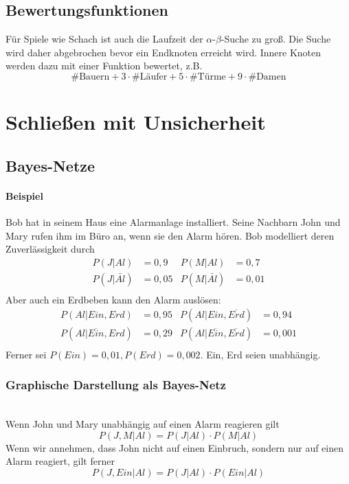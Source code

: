 \documentclass[a4paper]{scrartcl}
\begin{document}
\subsection{Bewertungsfunktionen} Für Spiele wie Schach ist auch die Laufzeit der $\alpha$-$\beta$-Suche zu groß. Die Suche wird daher abgebrochen bevor ein Endknoten erreicht wird. Innere Knoten werden dazu mit einer Funktion bewertet, z.B.
\[ \text{\# Bauern} + 3 \cdot \text{\# Läufer} + 5\cdot \text{\# Türme} + 9 \cdot \text{\# Damen} \]

\section{Schließen mit Unsicherheit}
\subsection{Bayes-Netze}
\paragraph{Beispiel} Bob hat in seinem Haus eine Alarmanlage installiert. Seine Nachbarn John und Mary rufen ihm im Büro an, wenn sie den Alarm hören. Bob modelliert deren Zuverlässigkeit durch
\begin{align*}
P(J | Al ) &= 0,9  &P(M | Al) &= 0,7 \\
P(J | \bar{Al} ) &= 0,05 &P(M | \bar{Al} ) &= 0,01\\
\end{align*}
Aber auch ein Erdbeben kann den Alarm auslösen:
\begin{align*}
P(Al | Ein,Erd) &= 0,95 &P(Al | Ein, \overline{Erd}) &= 0,94 \\
P(Al | \overline{Ein},Erd) &= 0,29 &P(Al | \overline{Ein}, \overline{Erd} ) &= 0,001\\
\end{align*}
Ferner sei $P(Ein) = 0,01, P(Erd) = 0,002$. Ein, Erd seien unabhängig.

\subsubsection{Graphische Darstellung als Bayes-Netz}
\\
Wenn John und Mary unabhängig auf einen Alarm reagieren gilt
\[ P(J,M|Al) = P(J|Al) \cdot P(M | Al) \]
Wenn wir annehmen, dass John nicht auf einen Einbruch, sondern nur auf einen Alarm reagiert, gilt ferner
\[ P(J,Ein | Al) = P(J|Al) \cdot P(Ein |Al) \]
\end{document}
